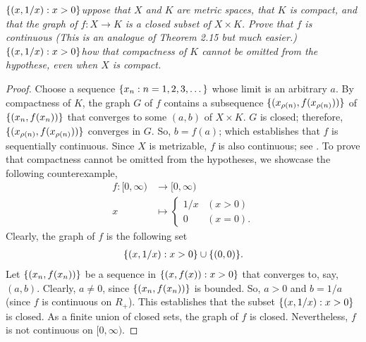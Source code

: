 \textit{%
$\{(x,1/x): x > 0\}$uppose that $X$ and $K$ are metric spaces, %
that $K$ is compact, and that the graph of %
%
  $f:X\to K$ %
%
is a closed subset of $X\times K$. %
Prove that $f$ is continuous %
%
  (This is an analogue of Theorem 2.15 but much easier.) %
%
$\{(x,1/x): x > 0\}$how that compactness of $K$ cannot be omitted from the hypothese, %
even when $X$ is compact.
}
%
\begin{proof}%
Choose a sequence $\{x_n: n=1, 2, 3, \dots\}$ whose limit is an arbitrary $a$. %
By compactness of $K$, the graph $G$ of $f$ contains a subsequence %
%
  $\{
    (x_{\rho(n)}, f(x_{\rho(n)}))
  \}$
%
of %
%
  $\{
    (x_n, f(x_n))
  \}$
%
that converges to some $(a, b)$ of $X\times K$. %
$G$ is closed; therefore, $\{(x_{\rho(n)}, f(x_{\rho(n)}))\}$
converges in $G$. So, $b=f(a)$; %
which establishes that $f$ is sequentially continuous.
%
Since $X$ is metrizable, $f$ is also continuous; see \citeresultFA{[A6]}. %
%
\newline\newline\noindent %
%
To prove that compactness cannot be omitted from the hypotheses, %
we showcase the following counterexample, %
%
  \begin{align}
  f: [0, \infty) & \to [0, \infty)\\
     x & \mapsto\begin{cases}
       1/x & (x > 0)  \\
       0   & (x = 0).
    \end{cases}
  \end{align}
%
Clearly, the graph of $f$ is the following set
%
  \begin{align}
    \{(x, 1/x): x > 0\} \cup \{(0, 0)\}.
  \end{align}
%
Let $\{(x_n, f(x_n))\}$ be a sequence in $\{(x,f(x)): x > 0\}$ %
that converges to, say, $(a, b)$. %
Clearly, $a\neq 0$, since $\{(x_n, f(x_n))\}$ is bounded. %
So, $a > 0$ and $b = 1/a$ (since $f$ is continuous on $R_+$).
This establishes that the subset $\{(x,1/x): x > 0\}$ is closed. %
As a finite union of closed sets, the graph of $f$ is closed. 
%
Nevertheless, $f$ is not continuous on $[0, \infty)$.
\end{proof}
%
